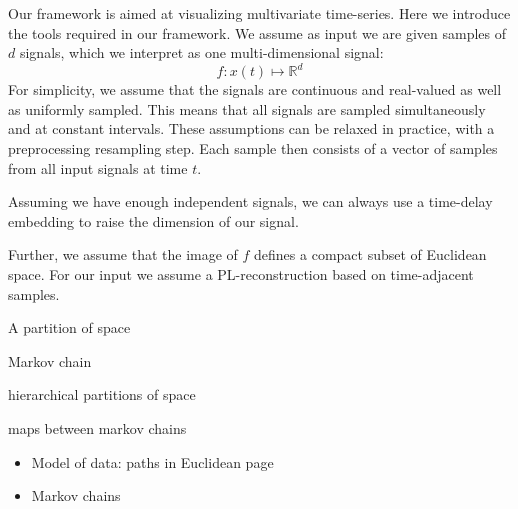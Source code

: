 \label{sec:preliminaries}
Our framework is aimed at visualizing multivariate time-series. Here we introduce the tools required in our framework. We assume as input we are given samples of $d$ signals, which we interpret as one multi-dimensional signal:
$$f: x(t)\mapsto \mathbb{R}^d$$
For simplicity, we assume that the signals are continuous and real-valued as well as uniformly sampled. This means that all signals are sampled simultaneously and at constant intervals. These assumptions can be relaxed in practice, with a preprocessing resampling step.  Each sample then consists of a vector of samples from all input signals at time $t$. 

Assuming we have enough independent signals, we can always use a time-delay embedding to raise the dimension of our signal. 

Further, we assume that the image of $f$ defines a compact subset of Euclidean space. For our input we assume a PL-reconstruction based on time-adjacent samples.

A partition of space 

Markov chain

hierarchical partitions of space

maps between markov chains


\begin{itemize}
\item Model of data: paths in Euclidean page
\item Markov chains
\end{itemize}